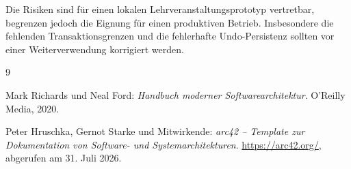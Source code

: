\documentclass[a4paper,11pt]{article}
\begin{document}
\vspace{0.3cm}

Die Risiken sind für einen lokalen Lehrveranstaltungsprototyp vertretbar, begrenzen jedoch die Eignung für einen produktiven Betrieb.
Insbesondere die fehlenden Transaktionsgrenzen und die fehlerhafte Undo-Persistenz sollten vor einer Weiterverwendung korrigiert werden.

\clearpage






\begin{thebibliography}{9}

Mark Richards und Neal Ford:
\textit{Handbuch moderner Softwarearchitektur}.
O'Reilly Media, 2020.

Peter Hruschka, Gernot Starke und Mitwirkende:
\textit{arc42 -- Template zur Dokumentation von Software- und Systemarchitekturen}.
\url{https://arc42.org/}, abgerufen am 31. Juli 2026.

\end{thebibliography}
\end{document}
